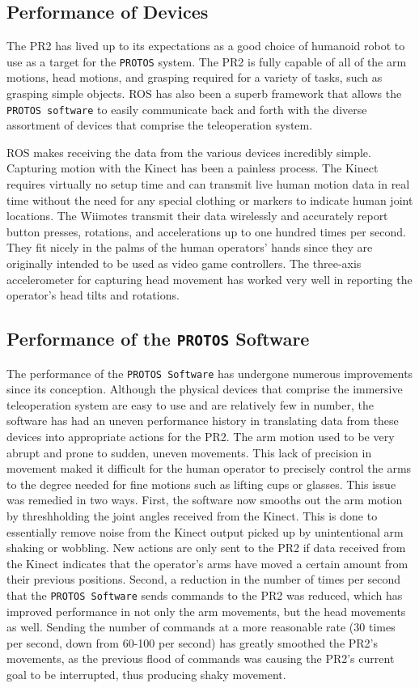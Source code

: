 \documentclass{sig-alternate}
\begin{document}
\subsection{Performance of Devices}
\indent The PR2 has lived up to its expectations as a good choice of humanoid robot to 
use as a target for the {\tt PROTOS} system. The 
PR2 is fully capable of all of the arm motions, head motions, and grasping
required for a variety of tasks, such as grasping simple objects. ROS has also been a superb framework that allows the 
{\tt PROTOS software} to easily communicate back and forth with the diverse 
assortment of devices that comprise the teleoperation system.

\indent  ROS makes receiving the data from the various devices incredibly simple. Capturing motion with the Kinect has been a painless process. 
The Kinect requires virtually no setup time and can transmit live human motion data in real time without the 
need for any special clothing or markers to indicate human joint locations.
The Wiimotes transmit their data wirelessly and accurately report button presses, rotations, and accelerations up to one hundred times per second. They fit 
nicely in the palms of the human operators' hands since they are originally intended to be used as video game controllers. The three-axis accelerometer for capturing head 
movement has worked very well in reporting the operator's head tilts and rotations.

\subsection {Performance of the {\tt PROTOS} Software}
\indent The performance of the {\tt PROTOS Software} has undergone numerous improvements since its conception. 
Although the physical devices that comprise the immersive teleoperation system 
are easy to use and are relatively few in number, the software has had an uneven performance history in translating data from these devices 
into appropriate actions for the PR2. The arm motion used to be very abrupt and prone to sudden, uneven movements. This lack of 
precision in movement maked it difficult for the human operator to precisely control the arms to the degree needed for fine motions such as lifting cups or glasses. This
issue was remedied in two ways. First, the software now smooths out the arm motion by threshholding the joint angles received from the Kinect.
This is done to essentially remove noise from the Kinect output picked up by unintentional arm shaking or wobbling. New actions are only sent to the PR2 if data received 
from the Kinect indicates that the operator's arms have moved a certain amount from their previous positions. Second, a reduction in the number of times per second that the
{\tt PROTOS Software} sends commands to the PR2 was reduced, which has improved performance in not only the arm movements, but the head movements as well. Sending the 
number of commands at a more reasonable rate (30 times per second, down from 60-100 per second) has greatly smoothed the PR2's movements, as the previous flood of commands
was causing the PR2's current goal to be interrupted, thus producing shaky movement.
\end{document}
